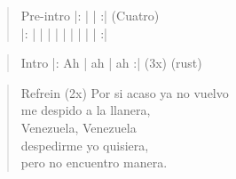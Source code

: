 \begin{verse}{Pre-intro}
\chord{}|:  \hspace{2em} |  \hspace{2em} |  \hspace{2em} :| (Cuatro) \\
\vspace{1em}
|:  |  \hspace{2em} | \hspace{3.9em} |  \hspace{2em} | \hspace{4em} |  \hspace{2em} |  \hspace{3em} |  \hspace{2em} | \hspace{0.3em} \hspace{2em} |  \hspace{2.55em} :|\\
\end{verse}

\begin{verse}{Intro}
|:  \hspace{1em}Ah \hspace{2em} | ah \hspace{2em} | ah \hspace{2em} :| (3x) \hspace{1em}  \hspace{1em}(rust)
\end{verse}



\begin{verse}{Refrein (2x)}
\chord{}Por si acaso ya no vuelvo\\
\chord{}me despido a la llanera,\\
Venezuela, Venezuela\\
despedirme yo quisiera,\\
pero no encuentro manera. \hspace{1em} \\
\end{verse}


